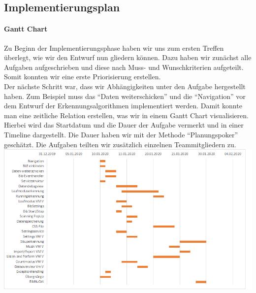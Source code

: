 \documentclass[a4paper,12pt]{article}
\begin{document}
\subsection{Implementierungsplan}
\paragraph{Gantt Chart}
Zu Beginn der Implementierungsphase haben wir uns zum ersten Treffen überlegt, wie wir den Entwurf nun gliedern können. Dazu haben wir zunächst alle Aufgaben aufgeschrieben und diese nach Muss- und Wunschkriterien aufgeteilt. Somit konnten wir eine erste Priorisierung erstellen.\\
 Der nächste Schritt war, dass wir Abhängigkeiten unter den Aufgabe hergestellt haben. Zum Beispiel muss das ``Daten weiterschicken'' und die ``Navigation'' vor dem Entwurf der Erkennungsalgorithmen implementiert werden. Damit konnte man eine zeitliche Relation erstellen, was wir in einem Gantt Chart visualisieren. Hierbei wird das Startdatum und die Dauer der Aufgabe vermerkt und in einer Timeline dargestellt.
Die Dauer haben wir mit der Methode ``Planungspoker'' geschätzt. Die Aufgaben teilten wir zusätzlich einzelnen Teammitgliedern zu.
\newline
\newline
\includegraphics[width=\textwidth, height=0.5\textheight]{bilder/Implementierungsplan.png}
\end{document}
